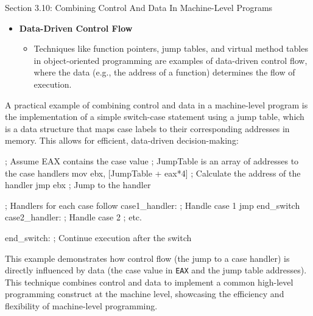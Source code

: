 \begin{notes}{Section 3.10: Combining Control And Data In Machine-Level Programs}
\begin{itemize}
\begin{itemize}
            over both the data and control flow aspects of a program, allowing for optimizations and functionality that are not possible or efficient in the high-level language alone.
        \end{itemize}
        \item \textbf{Data-Driven Control Flow}
        \begin{itemize}
            \item Techniques like function pointers, jump tables, and virtual method tables in object-oriented programming are examples of data-driven control flow, where the data (e.g., the address 
            of a function) determines the flow of execution.
        \end{itemize}
    \end{itemize}
    
    \begin{highlight}
        A practical example of combining control and data in a machine-level program is the implementation of a simple switch-case statement using a jump table, which is a data structure that maps 
        case labels to their corresponding addresses in memory. This allows for efficient, data-driven decision-making:
    
    \begin{code}[Assembly]
        ; Assume EAX contains the case value
        ; JumpTable is an array of addresses to the case handlers
        mov ebx, [JumpTable + eax*4] ; Calculate the address of the handler
        jmp ebx                      ; Jump to the handler
    
        ; Handlers for each case follow
    case1_handler:
        ; Handle case 1
        jmp end_switch
    case2_handler:
        ; Handle case 2
        ; etc.
    
    end_switch:
        ; Continue execution after the switch
    \end{code}
    
        This example demonstrates how control flow (the jump to a case handler) is directly influenced by data (the case value in \texttt{EAX} and the jump table addresses). This technique combines 
        control and data to implement a common high-level programming construct at the machine level, showcasing the efficiency and flexibility of machine-level programming.
    \end{highlight}    
\end{notes}
